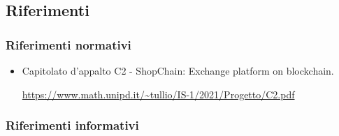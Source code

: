 \subsection{Riferimenti}
\subsubsection{Riferimenti normativi}
\begin{itemize}
    \item Capitolato d'appalto C2 - ShopChain: Exchange platform on blockchain.
    \begin{center}
       \url{https://www.math.unipd.it/~tullio/IS-1/2021/Progetto/C2.pdf}
    \end{center} 
\end{itemize}

\subsubsection{Riferimenti informativi}
